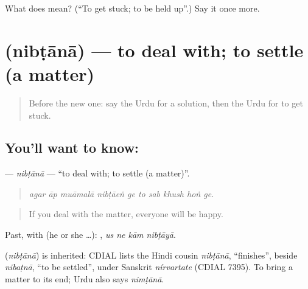 \begin{tcolorbox}[breakable,colback=teal!4,colframe=teal!35!black,title={Before you move on}]
What does  mean? (\textquotedblleft{}To get stuck; to be held up\textquotedblright{}.) Say it once more.
\end{tcolorbox}
\section[\texorpdfstring{\ur{نبٹانا} (nibṭānā)}{نبٹانا (nibṭānā)}]{ (nibṭānā) — to deal with; to settle (a matter)}

\label{lesson:UR-C368-nibtana}



\begin{quote}
Before the new one: say the Urdu for a solution, then the Urdu for to get stuck.
\end{quote}

\subsection*{You'll want to know: }
\textbf{} — \emph{nibṭānā} — \textquotedblleft{}to deal with; to settle (a matter)\textquotedblright{}.

\begin{quote}
         
\end{quote}

\begin{quote}
\emph{agar āp muāmalā nibṭāeṅ ge to sab khush hoṅ ge.}
\end{quote}

\begin{quote}
If you deal with the matter, everyone will be happy.
\end{quote}

Past, with  (he or she …):    , \emph{us ne kām nibṭāyā}.

\begin{cousinweb}
\textbf{} (\emph{nibṭānā}) is inherited: CDIAL lists the Hindi cousin \emph{nibṭānā}, \textquotedblleft{}finishes\textquotedblright{}, beside \emph{nibaṭnā}, \textquotedblleft{}to be settled\textquotedblright{}, under Sanskrit \emph{nírvartate} (CDIAL 7395). To bring a matter to its end; Urdu also says \emph{nimṭānā}.
\end{cousinweb}

